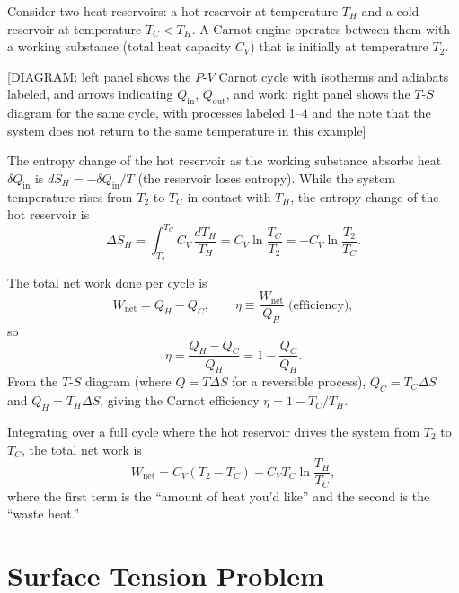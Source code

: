 Consider two heat reservoirs: a hot reservoir at temperature $T_H$ and a cold reservoir at
temperature $T_C < T_H$.  A Carnot engine operates between them with a working substance
(total heat capacity $C_V$) that is initially at temperature $T_2$.

\begin{center}[DIAGRAM: left panel shows the $P$-$V$ Carnot cycle with isotherms and adiabats labeled, and arrows indicating $Q_{\text{in}}$, $Q_{\text{out}}$, and work; right panel shows the $T$-$S$ diagram for the same cycle, with processes labeled 1--4 and the note that the system does not return to the same temperature in this example]\end{center}

The entropy change of the hot reservoir as the working substance absorbs heat $\delta Q_{\text{in}}$ is $dS_H = -\delta Q_{\text{in}}/T$ (the reservoir loses entropy).  While the system
temperature rises from $T_2$ to $T_C$ in contact with $T_H$, the entropy change of the hot
reservoir is
\begin{equation}
    \Delta S_H = \int_{T_2}^{T_C} C_V\,\frac{dT_H}{T_H} = C_V\ln\frac{T_C}{T_2}
               = -C_V\ln\frac{T_2}{T_C}.
\end{equation}

The total net work done per cycle is
\begin{equation}
    W_{\text{net}} = Q_H - Q_C, \qquad \eta \equiv \frac{W_{\text{net}}}{Q_H}\;\text{(efficiency)},
\end{equation}
so
\begin{equation}
    \eta = \frac{Q_H - Q_C}{Q_H} = 1 - \frac{Q_C}{Q_H}.
\end{equation}
From the $T$-$S$ diagram (where $Q = T\Delta S$ for a reversible process), $Q_C = T_C\Delta S$
and $Q_H = T_H\Delta S$, giving the Carnot efficiency $\eta = 1 - T_C/T_H$.

Integrating over a full cycle where the hot reservoir drives the system from $T_2$ to $T_C$,
the total net work is
\begin{equation}
    W_{\text{net}} = C_V(T_2 - T_C) - C_V T_C\ln\frac{T_H}{T_C},
\end{equation}
where the first term is the ``amount of heat you'd like'' and the second is the ``waste heat.''

\section{Surface Tension Problem}

